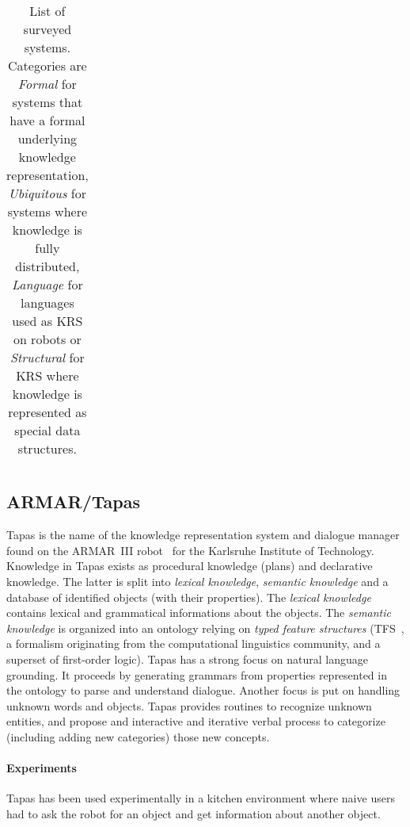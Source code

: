 \documentclass[journal]{IEEEtran}
\begin{document}
\begin{table*}
\begin{center}
\begin{tabular}{p{2.2cm}p{1.6cm}p{4cm}p{2.4cm}p{3.4cm}p{1.5cm}}
\bottomrule

\end{tabular}
\end{center}

\caption{List of surveyed systems. Categories are \emph{Formal} for systems
that have a formal underlying knowledge representation, \emph{Ubiquitous} for
systems where knowledge is fully distributed, \emph{Language} for languages
used as KRS on robots or \emph{Structural} for KRS where knowledge is
represented as special data structures.}

\label{table|surveyed-systems}
\end{table*}


\subsection{ARMAR/Tapas}

{\sc Tapas} is the name of the knowledge representation system and dialogue
manager found on the ARMAR~III robot~\cite{Holzapfel2008} for the Karlsruhe
Institute of Technology.
% 
Knowledge in {\sc Tapas} exists as procedural knowledge (plans) and declarative
knowledge. The latter is split into \emph{lexical knowledge}, \emph{semantic
knowledge} and a database of identified objects (with their properties). The
\emph{lexical knowledge} contains lexical and grammatical informations about
the objects. The \emph{semantic knowledge} is organized into an ontology
relying on \emph{typed feature structures} (TFS~\cite{Carpenter1992}, a
formalism originating from the computational linguistics community, and a
superset of first-order logic).
% 
{\sc Tapas} has a strong focus on natural language grounding. It proceeds by
generating grammars from properties represented in the ontology to parse and
understand dialogue.
% 
Another focus is put on handling unknown words and objects. {\sc Tapas}
provides routines to recognize unknown entities, and propose and interactive
and iterative verbal process to categorize (including adding new categories)
those new concepts.

\paragraph{Experiments} {\sc Tapas} has been used experimentally in a kitchen
environment where naive users had to ask the robot for an object and get
information about another object.
\end{document}
